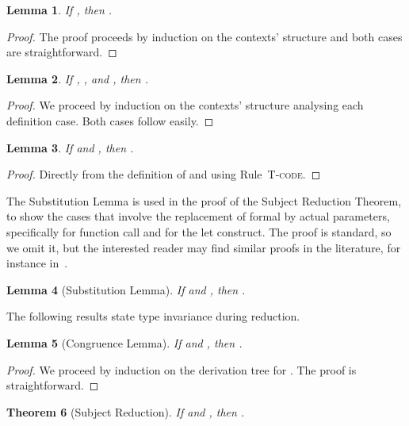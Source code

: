 \documentclass[copyright,creativecommons]{eptcs}
\newcommand{\mkTrule}[1]{{\footnotesize \textsc{T-#1}}}
\newcommand{\Tcode}{\mkTrule{code}}
\newtheorem{theorem}{Theorem}
\newtheorem{lemma}[theorem]{Lemma}
\begin{document}
\begin{lemma}
  \label{lemma:context-process}
  If , then .
\end{lemma}

\begin{proof}
  The proof proceeds by induction on the contexts' structure and
  both cases are straightforward. 
\end{proof}

\begin{lemma}
  \label{lemma:process-context}
  If , , and , then .
\end{lemma}

\begin{proof}
  We proceed by induction on the contexts' structure analysing each 
  definition case. Both cases follow easily.
\end{proof}

\begin{lemma}
  \label{lemma:module-substitution}
  If  and , 
  then .
\end{lemma}

\begin{proof}
  Directly from the definition of  and using Rule~\Tcode.
\end{proof}

The Substitution Lemma is used in the proof of the Subject Reduction
Theorem, to show the cases that involve the replacement of formal by
actual parameters, specifically for function call and for the let
construct.
The proof is standard, so we omit it, but the interested reader may
find similar proofs in the literature, for instance
in~\cite[Section 6.3]{sangiorgi.walker:theory-mobile}.

\begin{lemma}[Substitution Lemma]
  \label{lemma:substitution-lemma}
  If  and , then .
\end{lemma}

The following results state type invariance during reduction.

\begin{lemma}[Congruence Lemma]
  \label{lemma:congruence}
  If  and , then .
\end{lemma}

\begin{proof}
  We proceed by induction on the derivation tree for .
  The proof is straightforward.
\end{proof}

\begin{theorem}[Subject Reduction]
  \label{teo:subject-reduction}
  If  and , then .
\end{theorem}
\end{document}
